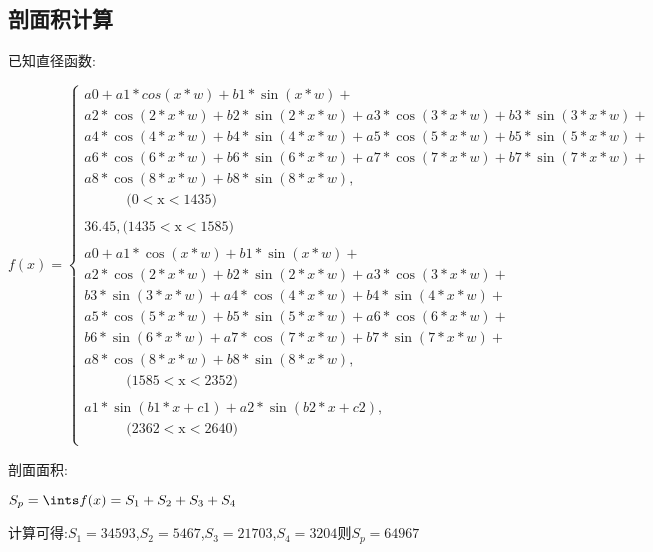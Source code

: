 \documentclass[UTF8]{ctexart}
\begin{document}
			\subsection{剖面积计算}
				\begin{flushleft}
					已知直径函数:
				\end{flushleft}
				\begin{center}
					$$
					f(x)=
					\begin{cases}
					a0 + a1*cos(x*w) + b1*\sin(x*w) + \\
					a2*\cos(2*x*w) + b2*\sin(2*x*w) + a3*\cos(3*x*w) + b3*\sin(3*x*w)+ \\
					a4*\cos(4*x*w) + b4*\sin(4*x*w) + a5*\cos(5*x*w) + b5*\sin(5*x*w)+ \\
					a6*\cos(6*x*w) + b6*\sin(6*x*w) + a7*\cos(7*x*w) + b7*\sin(7*x*w)+ \\
					a8*\cos(8*x*w) + b8*\sin(8*x*w),\\\quad\qquad \text{(0$<$x$<$1435)} \\
					\\
					36.45,\text{(1435$<$x$<$1585)}\\
					\\
					a0 + a1*\cos(x*w) + b1*\sin(x*w) + \\
					a2*\cos(2*x*w) + b2*\sin(2*x*w) + a3*\cos(3*x*w) +\\ b3*\sin(3*x*w)+ 
					a4*\cos(4*x*w) + b4*\sin(4*x*w) +\\ a5*\cos(5*x*w) + b5*\sin(5*x*w)+ 
					a6*\cos(6*x*w) +\\ b6*\sin(6*x*w) + a7*\cos(7*x*w) + b7*\sin(7*x*w)+ \\
					a8*\cos(8*x*w) + b8*\sin(8*x*w),\\\quad\qquad\text{(1585$<$x$<$2352)}\\
					\\
					a1*\sin(b1*x+c1) + a2*\sin(b2*x+c2),\\\quad\qquad\text{(2362$<$x$<$2640)}\\
					\end{cases}
					$$
				\end{center}
				\begin{flushleft}
					剖面面积:
				\end{flushleft}
				\begin{center}
					$S_p=\ints f(x)=S_1+S_2+S_3+S_4$
				\end{center}
			\begin{flushleft}
				计算可得:\quad$S_1=34593$,$S_2=5467$,$S_3=21703$,$S_4=3204$\qquad 则$S_p=64967$
			\end{flushleft}
\end{document}
